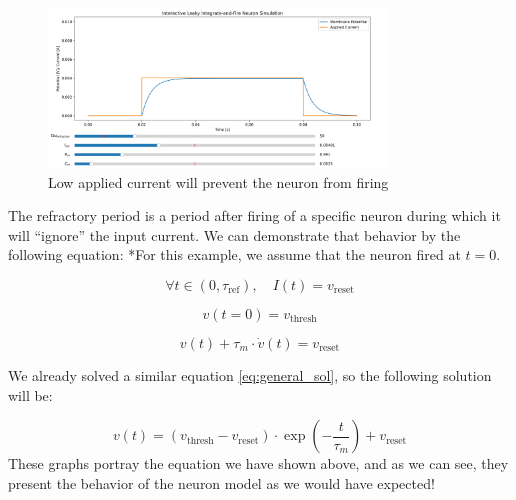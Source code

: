 \begin{figure}[H]
    \centering
    \includegraphics[width=0.8\textwidth]{scientific-background/computational-models/LIF/graphs/LIF-heaviside-low-input.png}
    \caption{Low applied current will prevent the neuron from firing}
    \label{fig:LIF-heaviside-low-input}
\end{figure}

The refractory period is a period after firing of a specific neuron during which it will ``ignore'' the input current. We can demonstrate that behavior by the following equation:
*For this example, we assume that the neuron fired at \( t=0 \).

\begin{equation}
    \forall t \in (0,\tau_{\text{ref}}), \quad I(t) = v_{\text{reset}}
\end{equation}

\begin{equation}
    v(t=0) = v_{\text{thresh}}
\end{equation}

\begin{equation}
    v(t) + \tau_m \cdot \dot{v}(t) = v_{\text{reset}}
\end{equation}

We already solved a similar equation \ref{eq:general_sol}, so the following solution will be:

\begin{equation}
    v(t) = (v_{\text{thresh}} - v_{\text{reset}}) \cdot \exp\left(-\frac{t}{\tau_m}\right) + v_{\text{reset}}
\end{equation}
These graphs portray the equation we have shown above, and as we can see, they present the behavior of the neuron model as we would have expected!
